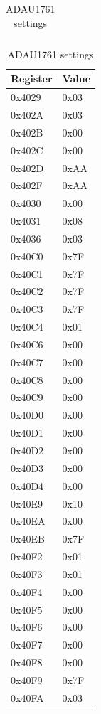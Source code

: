 \begin{table}[!htb]
\begin{subtable}{.5\linewidth}
\begin{tabular}{l|l}
			\hline
        \end{tabular}
    \end{subtable}%
    \begin{subtable}{.5\linewidth}
      \centering
        \begin{tabular}{l|l}
			Register & Value \\
			\hline
			\hline
			0x4029 & 0x03 \\
			0x402A & 0x03 \\
			0x402B & 0x00 \\
			0x402C & 0x00 \\
			0x402D & 0xAA \\
			0x402F & 0xAA \\
			0x4030 & 0x00 \\
			0x4031 & 0x08 \\
			0x4036 & 0x03 \\
			0x40C0 & 0x7F \\
			0x40C1 & 0x7F \\
			0x40C2 & 0x7F \\
			0x40C3 & 0x7F \\
			0x40C4 & 0x01 \\
			0x40C6 & 0x00 \\
			0x40C7 & 0x00 \\
			0x40C8 & 0x00 \\
			0x40C9 & 0x00 \\
			0x40D0 & 0x00 \\
			0x40D1 & 0x00 \\
			0x40D2 & 0x00 \\
			0x40D3 & 0x00 \\
			0x40D4 & 0x00 \\
			0x40E9 & 0x10 \\
			0x40EA & 0x00 \\
			0x40EB & 0x7F \\
			0x40F2 & 0x01 \\
			0x40F3 & 0x01 \\
			0x40F4 & 0x00 \\
			0x40F5 & 0x00 \\
			0x40F6 & 0x00 \\
			0x40F7 & 0x00 \\
			0x40F8 & 0x00 \\
			0x40F9 & 0x7F \\
			0x40FA & 0x03 \\
			\hline
        \end{tabular}
    \end{subtable}
    \caption{ADAU1761 settings}
\end{table}
